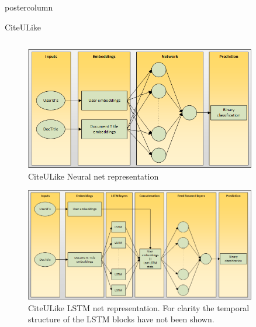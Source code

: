 \documentclass[final,hyperref={pdfpagelabels=false}]{beamer}
\begin{document}
\begin{frame}
\begin{columns}
\begin{column}{.49\paperwidth}
\begin{beamercolorbox}[center,wd=\textwidth]{postercolumn}
\begin{minipage}[T]{.99\textwidth}
{\begin{block}{CiteULike}
\begin{columns}
\begin{column}{1\textwidth}
\begin{minipage}[t]{0.96\textwidth}
 \begin{figure}

\includegraphics[width=0.9\textwidth]{CiteuLikeNet.png}
 \caption{CiteULike Neural net representation} \label{fig:CuL_net}
\end{figure}  

\begin{figure}

\includegraphics[width=0.9\textwidth]{CiteuLikeLSTM.png}
 \caption{CiteULike LSTM net representation. For clarity the temporal structure of the LSTM blocks have not been shown.} \label{fig:CuL_lstm_net}
\end{figure}


\begin{columns}
 \begin{column}{0.33\textwidth}
 

	\begin{figure}


\end{figure}
\end{column}
\end{columns}
\end{minipage}
\end{column}
\end{columns}
\end{block}}
\end{minipage}
\end{beamercolorbox}
\end{column}
\end{columns}
\end{frame}
\end{document}
